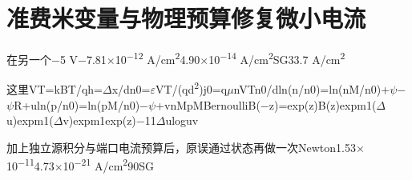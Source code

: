 \section{{\cjkfont 准费米变量与物理预算修复微小电流}\allowbreak{}}\label{sec:51}
{\cjkfont 在另一个}\allowbreak{}−5 V\allowbreak{}−7.81\ensuremath{\times}10\textsuperscript{−12} A/cm\textsuperscript{2}\allowbreak{}4.90\ensuremath{\times}10\textsuperscript{−14} A/cm\textsuperscript{2}\allowbreak{}SG\allowbreak{}33.7 A/cm\textsuperscript{2}\allowbreak{}
\par
{\cjkfont 这里}\allowbreak{}VT=\allowbreak{}kBT/q\allowbreak{}h=\allowbreak{}\ensuremath{\Delta}x/d\allowbreak{}n0=\allowbreak{}\ensuremath{\varepsilon}VT/(qd\textsuperscript{2})\allowbreak{}j0=\allowbreak{}q\ensuremath{\mu}nVTn0/d\allowbreak{}ln(n/n0)=\allowbreak{}ln(nM/n0)+\ensuremath{\psi}−\ensuremath{\psi}R+u\allowbreak{}ln(p/n0)=\allowbreak{}ln(pM/n0)−\ensuremath{\psi}+v\allowbreak{}nM\allowbreak{}pM\allowbreak{}Bernoulli\allowbreak{}B(−z)=\allowbreak{}exp(z)B(z)\allowbreak{}expm1(\ensuremath{\Delta}u)\allowbreak{}expm1(\ensuremath{\Delta}v)\allowbreak{}expm1\allowbreak{}exp(z)−1\allowbreak{}1\allowbreak{}\ensuremath{\Delta}u\allowbreak{}log\allowbreak{}u\allowbreak{}v\allowbreak{}
\par
{\cjkfont 加上独立源积分与端口电流预算后，原误通过状态再做一次}\allowbreak{}Newton\allowbreak{}1.53\ensuremath{\times}10\textsuperscript{−11}\allowbreak{}4.73\ensuremath{\times}10\textsuperscript{−21} A/cm\textsuperscript{2}\allowbreak{}90\allowbreak{}SG\allowbreak{}
